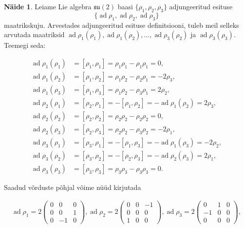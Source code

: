 \documentclass[12pt,a4paper,oneside]{article}
\theoremstyle{plain}
\theoremstyle{definition}
\newtheorem{naide}{Näide}[section]
\numberwithin{equation}{section}
\def\su2{{\mathfrak{ su}\left(2\right)}}
\DeclareMathOperator{\ad}{ad}
\begin{document}
\begin{naide}
Leiame Lie algebra $\su2$ baasi $\{\rho_1, \rho_2, \rho_3\}$ 
adjungeeritud esituse
\[\{\ad \rho_1, \ad \rho_2, \ad \rho_3\}\]
maatrikskuju. Arvestades adjungeeritud esituse definitsiooni, tuleb 
meil selleks arvutada maatriksid $\ad \rho_1 \left(\rho_1\right), 
\ad \rho_1 \left(\rho_2\right), \ldots, 
\ad \rho_3 \left(\rho_2\right)$ ja $\ad \rho_3 \left(\rho_3\right)$. 
Teemegi seda:

\begin{align*}
\ad \rho_1 \left(\rho_1\right) &= \left[\rho_1, \rho_1\right] = 
	\rho_1 \rho_1 - \rho_1 \rho_1 = 0, \\
\ad \rho_1 \left(\rho_2\right) &= \left[\rho_1, \rho_2\right] = 
	\rho_1 \rho_2 - \rho_2 \rho_1 = -2\rho_3, \\
\ad \rho_1 \left(\rho_3\right) &= \left[\rho_1, \rho_3\right] = 
	\rho_1 \rho_2 - \rho_3 \rho_1 = 2\rho_2, \\
\ad \rho_2 \left(\rho_1\right) &= \left[\rho_2, \rho_1\right] = 
	-\left[\rho_1, \rho_2\right] = - \ad \rho_1 \left(\rho_2\right) 
	= 2\rho_3, \\
\ad \rho_2 \left(\rho_2\right) &= \left[\rho_2, \rho_2\right] = 
	\rho_2 \rho_2 - \rho_2 \rho_2 = 0, \\
\ad \rho_2 \left(\rho_3\right) &= \left[\rho_2, \rho_3\right] = 
	\rho_2 \rho_2 - \rho_3 \rho_2 = -2\rho_1, \\
\ad \rho_3 \left(\rho_1\right) &= \left[\rho_3, \rho_1\right] = 
	-\left[\rho_1, \rho_3\right] = - 
	\ad \rho_1 \left(\rho_3\right) = -2\rho_2, \\
\ad \rho_3 \left(\rho_2\right) &= \left[\rho_3, \rho_2\right] = 
	-\left[\rho_2, \rho_3\right] = 
	-\ad \rho_2 \left(\rho_3\right) = 2\rho_1, \\
\ad \rho_3 \left(\rho_3\right) &= \left[\rho_3, \rho_3\right] = 
	\rho_3 \rho_3 - \rho_3 \rho_3 = 0.
\end{align*}

Saadud võrduste põhjal võime nüüd kirjutada

\begin{align*}
\ad \rho_1 = 2\begin{pmatrix}
0 & 0 & 0 \\
0 & 0 & 1 \\
0 & -1 & 0
\end{pmatrix}, 
\ad \rho_2 = 2\begin{pmatrix}
0 & 0 & -1 \\
0 & 0 & 0 \\
1 & 0 & 0
\end{pmatrix}, 
\ad \rho_3 = 2\begin{pmatrix}
0 & 1 & 0 \\
-1 & 0 & 0 \\
0 & 0 & 0
\end{pmatrix},
\end{align*}


\end{naide}
\end{document}
